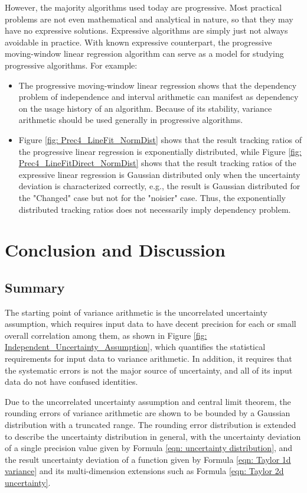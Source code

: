 \documentclass[twoside]{article}
\numberwithin{equation}{section}
\begin{document}
However, the majority algorithms used today are progressive.  Most practical problems are not even mathematical and analytical in nature, so that they may have no expressive solutions.  Expressive algorithms are simply just not always avoidable in practice.  With known expressive counterpart, the progressive moving-window linear regression algorithm can serve as a model for studying progressive algorithms.  For example:
\begin{itemize}
\item The progressive moving-window linear regression shows that the dependency problem of independence and interval arithmetic can manifest as dependency on the usage history of an algorithm.  Because of its stability, variance arithmetic should be used generally in progressive algorithms.  
\item Figure \ref{fig: Prec4_LineFit_NormDist} shows that the result tracking ratios of the progressive linear regression is exponentially distributed, while Figure \ref{fig: Prec4_LineFitDirect_NormDist} shows that the result tracking ratios of the expressive linear regression is Gaussian distributed only when the uncertainty deviation is characterized correctly, e.g., the result is Gaussian distributed for the "Changed" case but not for the "noisier" case.  Thus, the exponentially distributed tracking ratios does not necessarily imply dependency problem.
\end{itemize}
  

\clearpage
\section{Conclusion and Discussion}
\label{sec: conclusion and discussion}

\subsection{Summary}

The starting point of variance arithmetic is the uncorrelated uncertainty assumption, which requires input data to have decent precision for each or small overall correlation among them, as shown in Figure \ref{fig: Independent_Uncertainty_Assumption}, which quantifies the statistical requirements for input data to variance arithmetic.  In addition, it requires that the systematic errors is not the major source of uncertainty, and all of its input data do not have confused identities.    

Due to the uncorrelated uncertainty assumption and central limit theorem, the rounding errors of variance arithmetic are shown to be bounded by a Gaussian distribution with a truncated range.  The rounding error distribution is extended to describe the uncertainty distribution in general, with the uncertainty deviation of a single precision value given by Formula \eqref{eqn: uncertainty distribution}, and the result uncertainty deviation of a function given by Formula \eqref{eqn: Taylor 1d variance} and its multi-dimension extensions such as Formula \eqref{eqn: Taylor 2d uncertainty}.  
\end{document}
